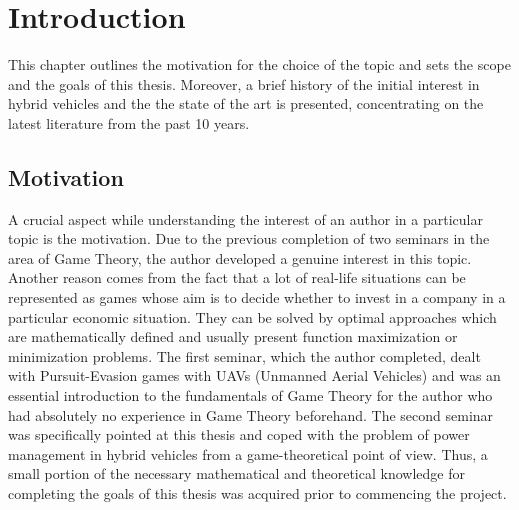 \chapter{Introduction}
\label{chp:intro}
This chapter outlines the motivation for the choice of the topic and sets the scope and the goals of this thesis. Moreover, a brief history of the initial interest in hybrid vehicles and the the state of the art is presented, concentrating on the latest literature from the past 10 years.

\section{Motivation}
A crucial aspect while understanding the interest of an author in a particular topic is the motivation. Due to the previous completion of two seminars in the area of Game Theory, the author developed a genuine interest in this topic. Another reason comes from the fact that a lot of real-life situations can be represented as games whose aim is to decide whether to invest in a company in a particular economic situation. They can be solved by optimal approaches which are mathematically defined and usually present function maximization or minimization problems. The first seminar, which the author completed, dealt with Pursuit-Evasion games with UAVs (Unmanned Aerial Vehicles) and was an essential introduction to the fundamentals of Game Theory for the author who had absolutely no experience in Game Theory beforehand. The second seminar was specifically pointed at this thesis and coped with the problem of power management in hybrid vehicles from a game-theoretical point of view. Thus, a small portion of the necessary mathematical and theoretical knowledge for completing the goals of this thesis was acquired prior to commencing the project.

